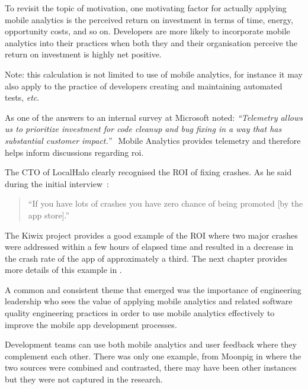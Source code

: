 To revisit the topic of motivation, one motivating factor for actually applying mobile analytics is the perceived return on investment in terms of time, energy, opportunity costs, and so on. Developers are more likely to incorporate mobile analytics into their practices when both they and their organisation perceive the return on investment is highly net positive.

\begin{kaobox}[frametitle=ROI in software development]
Note: this calculation is not limited to use of mobile analytics, for instance it may also apply to the practice of developers creating and maintaining automated tests, \textit{etc}.

As one of the answers to an internal survey at Microsoft noted: \emph{``Telemetry allows us to prioritize investment for code
cleanup and bug fixing in a way that has substantial
customer impact.''}~ Mobile Analytics provides telemetry and therefore helps inform discussions regarding \Gls{roi}. 
\end{kaobox}


The CTO of LocalHalo clearly recognised the ROI of fixing crashes. As he said during the initial interview~: 

\begin{quote}
    ``If you have lots of crashes you have zero chance of being promoted [by the app store].''
\end{quote}

The Kiwix project provides a good example of the ROI where two major crashes were addressed within a few hours of elapsed time and resulted in a decrease in the crash rate of the app of approximately a third. The next chapter provides more details of this example in .

A common and consistent theme that emerged was the importance of engineering leadership who sees the value of applying mobile analytics and related software quality engineering practices in order to use mobile analytics effectively to improve the mobile app development processes. 

Development teams can use both mobile analytics and user feedback where they complement each other. There was only one example, from Moonpig in  where the two sources were combined and contrasted, there may have been other instances but they were not captured in the research. 

